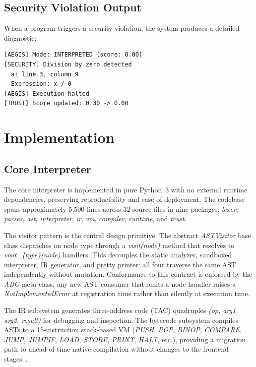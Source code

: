 \documentclass[conference]{IEEEtran}
\begin{document}
\subsection{Security Violation Output}

When a program triggers a security violation, the system produces
a detailed diagnostic:

\begin{lstlisting}[caption={Security violation output},
                   label={lst:violation}]
[AEGIS] Mode: INTERPRETED (score: 0.00)
[SECURITY] Division by zero detected
  at line 3, column 9
  Expression: x / 0
[AEGIS] Execution halted
[TRUST] Score updated: 0.30 -> 0.00
\end{lstlisting}

\section{Implementation}
\label{sec:impl}

\subsection{Core Interpreter}

The core interpreter is implemented in pure Python~3 with no
external runtime dependencies, preserving reproducibility and ease
of deployment. The codebase spans approximately 5,500 lines across
32 source files in nine packages: \textit{lexer}, \textit{parser},
\textit{ast}, \textit{interpreter}, \textit{ir}, \textit{vm},
\textit{compiler}, \textit{runtime}, and \textit{trust}.

The visitor pattern is the central design primitive. The abstract
\textit{ASTVisitor} base class dispatches on node type through a
\textit{visit(node)} method that resolves to
\textit{visit\_\{type\}(node)} handlers. This decouples the static
analyzer, sandboxed interpreter, IR generator, and pretty printer:
all four traverse the same AST independently without mutation.
Conformance to this contract is enforced by the \textit{ABC}
meta-class; any new AST consumer that omits a node handler raises a
\textit{NotImplementedError} at registration time rather than
silently at execution time.

The IR subsystem generates three-address code (TAC) quadruples
\textit{(op, arg1, arg2, result)} for debugging and inspection.
The bytecode subsystem compiles ASTs to a 15-instruction stack-based
VM (\textit{PUSH}, \textit{POP}, \textit{BINOP}, \textit{COMPARE},
\textit{JUMP}, \textit{JUMPIF}, \textit{LOAD}, \textit{STORE},
\textit{PRINT}, \textit{HALT}, etc.), providing a migration path
to ahead-of-time native compilation without changes to the frontend
stages~\cite{aho2007compilers}.
\end{document}
